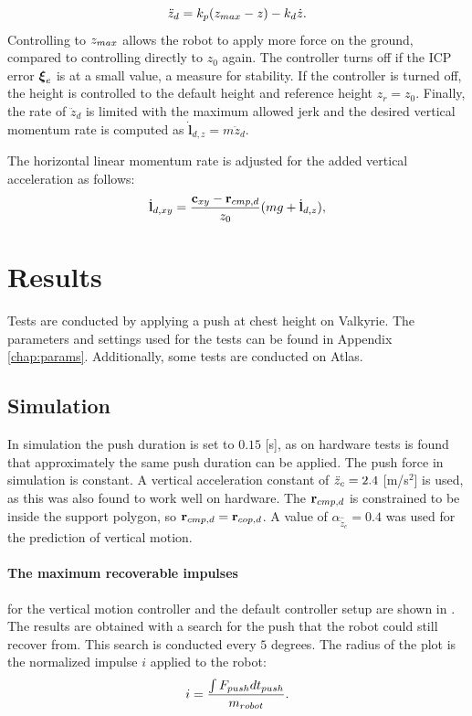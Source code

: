 \begin{equation}
	\ddot{z}_d = k_p(z_{max}-z)-k_d\dot{z}.
\end{equation}
Controlling to $z_{max}$ allows the robot to apply more force on the ground, compared to controlling directly to $z_0$ again. The controller turns off if the \ac{ICP} error $\boldsymbol{\xi}_e$ is at a small value, a measure for stability. If the controller is turned off, the height is controlled to the default height and reference height $z_r=z_0$. Finally, the rate of $\ddot{z}_d$ is limited with the maximum allowed jerk and the desired vertical momentum rate is computed as $\dot{\mathbf{l}}_{d,z}=m\ddot{z}_d$. 

The horizontal linear momentum rate is adjusted for the added vertical acceleration as follows:
\begin{equation}
    \dot{\mathbf{l}}_{d,xy}= \frac{\mathbf{c}_{xy}-\mathbf{r}_{cmp,d}}{z_0}(mg+\dot{\mathbf{l}}_{d,z}),
\end{equation}

\section{Results}
Tests are conducted by applying a push at chest height on Valkyrie. The parameters and settings used for the tests can be found in Appendix \ref{chap:params}. Additionally, some tests are conducted on Atlas.

\subsection{Simulation}
In simulation the push duration is set to $0.15$ [s], as on hardware tests is found that approximately the same push duration can be applied. The push force in simulation is constant. A vertical acceleration constant of $\ddot{z}_{c}=2.4$ [m/s$^2$] is used, as this was also found to work well on hardware. The $\mathbf{r}_{cmp,d}$ is constrained to be inside the support polygon, so $\mathbf{r}_{cmp,d}=\mathbf{r}_{cop,d}$. A value of $\alpha_{\hat{\ddot{z}}_{c}}=0.4$ was used for the prediction of vertical motion.

\paragraph{The maximum recoverable impulses} for the vertical motion controller and the default controller setup are shown in . The results are obtained with a search for the push that the robot could still recover from. This search is conducted every $5$ degrees. The radius of the plot is the normalized impulse $i$ applied to the robot:
\begin{equation}
	i = \frac{\int F_{push} dt_{push}}{m_{robot}}.
\end{equation}

